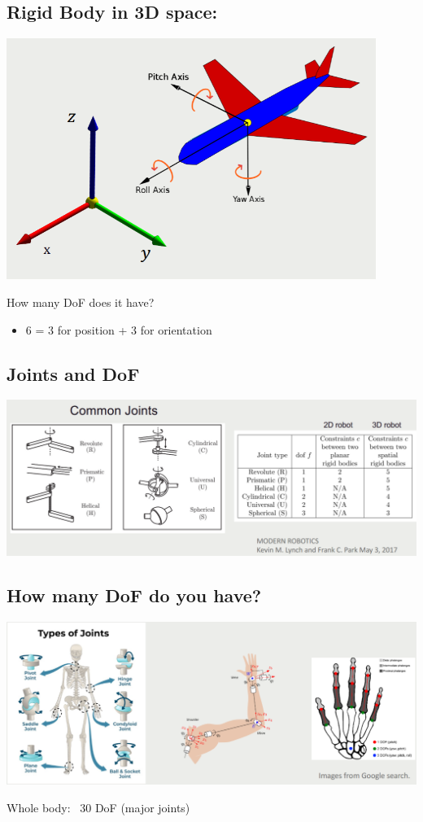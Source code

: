 \documentclass[10pt]{article}
\begin{document}
\subsection*{Rigid Body in 3D space:}
\begin{center} 
	\includegraphics*[width=0.9\textwidth]{L2_3.png} 
\end{center}
How many DoF does it have?
\begin{itemize}
    \item 6 = 3 for position + 3 for orientation
\end{itemize}

\subsection*{Joints and DoF}
\begin{center} 
	\includegraphics*[width=\textwidth]{L2_4.png}
\end{center}
\subsection*{How many DoF do you have?}
\begin{center} 
	\includegraphics*[width=\textwidth]{L2_5.png} 
\end{center}
Whole body: ~30 DoF (major joints)
\end{document}
